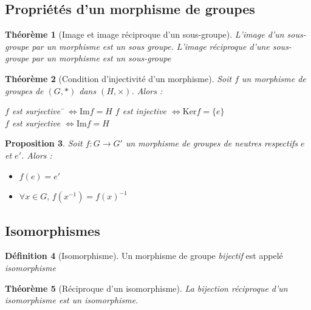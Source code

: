 \documentclass[11pt,a4paper]{report}
\newtheorem{theorem}{Théorème}[chapter]
\newtheorem{itheorem}[theorem]{Théorème}
\newtheorem{prop}[theorem]{Proposition}
\theoremstyle{definition}
\newtheorem{dfn}[theorem]{Définition}
\begin{document}
\subsection{Propriétés d'un morphisme de groupes} %
\label{sub:proprietes_d_un_morphisme}
\begin{theorem}[Image et image réciproque d'un sous-groupe]
     L'image d'un sous-groupe par un morphisme est un sous groupe. \newline
     L'image réciproque d'une sous-groupe par un morphisme est un sous-groupe\\
     \begin{center}
     \end{center}
\end{theorem}
\begin{itheorem}[Condition d'injectivité d'un morphisme]
     Soit $f$ un morphisme de groupes de $\left( G,* \right) $ dans $\left( H, \times \right) $. Alors : 
     \begin{tabbing}
          $f$ est \= \emph{surjective} \= $\Leftrightarrow \mathrm{Im} f = H$ \kill
          $f$ est \> \emph{injective} \> $\Leftrightarrow \mathrm{Ker} f = \lbrace e \rbrace$ \\
          $f$ est \> \emph{surjective} \> $\Leftrightarrow \mathrm{Im} f = H$
     \end{tabbing}
\end{itheorem}
\begin{prop}
Soit $f : G \to G'$ un morphisme de groupes de neutres respectifs $e$ et $e'$. Alors : 
     \begin{itemize}
         \item $f(e) = e'$
         \item $\forall x\in G,\, f(x^{-1}) = f(x)^{-1}$
     \end{itemize}
\end{prop}

\subsection{Isomorphismes} %
\label{sub:isomorphismes}
\begin{dfn}[Isomorphisme]
     Un morphisme de groupe \emph{bijectif} est appelé \emph{isomorphisme}
\end{dfn}
\begin{theorem}[Réciproque d'un isomorphisme]
     La bijection réciproque d'un isomorphisme est un isomorphisme.
\end{theorem}
\end{document}
